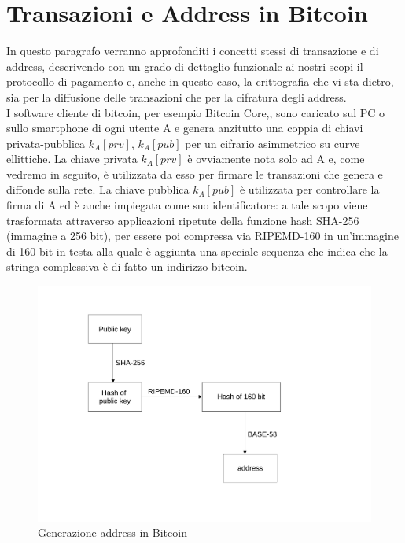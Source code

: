 \section{Transazioni e Address in Bitcoin}
In questo  paragrafo verranno approfonditi i concetti stessi di transazione e di address, descrivendo con un grado di dettaglio funzionale ai nostri scopi il protocollo di pagamento e, anche in questo caso, la crittografia che vi sta dietro, sia per la diffusione delle transazioni che per la cifratura degli address.\\I software cliente di bitcoin, per esempio Bitcoin Core,, sono caricato sul PC o sullo smartphone di ogni utente A e genera anzitutto una coppia di chiavi privata-pubblica $k_A [prv]$, $k_A [pub]$ per un cifrario asimmetrico su curve ellittiche. La
chiave privata $k_A [prv]$ è ovviamente nota solo ad A e, come vedremo in seguito, è utilizzata da esso per ﬁrmare le transazioni che genera e diﬀonde sulla rete. La chiave pubblica $k_A [pub]$ è utilizzata per controllare la ﬁrma di A ed è anche impiegata come suo identiﬁcatore: a tale scopo viene trasformata attraverso applicazioni ripetute della funzione hash SHA-256 (immagine a 256 bit), per essere poi compressa via RIPEMD-160 in un’immagine di 160 bit in testa alla quale è aggiunta una speciale sequenza che indica che la stringa complessiva è di fatto un indirizzo bitcoin.
\begin{figure}[h!]
    \centering
    \includegraphics[scale=0.5, trim = 1cm 2cm 0cm 2cm, clip]{Images/address_gen.pdf}
    \caption{Generazione address in Bitcoin}
    \label{fig:sha-256_address}
\end{figure}
\FloatBarrier
